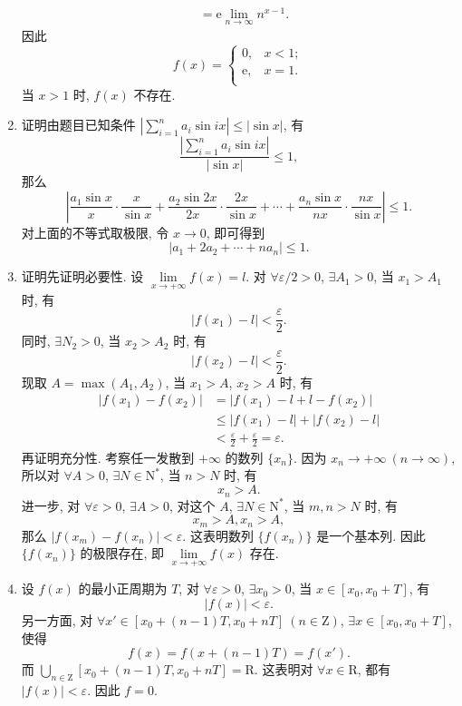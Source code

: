 \begin{enumerate}
\begin{align*}
                 &= \mathrm{e} \lim_{n\to\infty} n^{x-1}.
        \end{align*}
        因此
        \[
            f(x) =
                \begin{cases}
                    0, & x < 1; \\
                    \mathrm{e}, & x = 1. \\
                \end{cases}
        \]
        当 $x > 1$ 时, $f(x)$ 不存在.
    \item %
        {\heiti 证明}\quad 由题目已知条件 $\left|\sum\limits_{i=1}^n a_i\sin ix\right| \leqslant |\sin x|$, 有
        \[
            \frac{\left|\sum\limits_{i=1}^n a_i\sin ix\right|}{|\sin x|} \leqslant 1,   
        \]
        那么
        \[
            \left| \frac{a_1\sin x}{x}\cdot\frac{x}{\sin x} + \frac{a_2\sin2x}{2x}\cdot\frac{2x}{\sin x} + \cdots + \frac{a_n\sin x}{nx}\cdot\frac{nx}{\sin x} \right| \leqslant 1.
        \]
        对上面的不等式取极限, 令 $x \to 0$, 即可得到
        \[
            |a_1 + 2a_2 + \cdots + na_n| \leqslant 1.
        \]
    \item %
        {\heiti 证明}\quad 先证明必要性. 设 $\lim\limits_{x\to+\infty}f(x) = l$. 对 $\forall \varepsilon/2 > 0$, $\exists A_1 > 0$, 当 $x_1 > A_1$ 时, 有
        \[
            |f(x_1) - l| < \frac\varepsilon2.    
        \]
        同时, $\exists N_2 > 0$, 当 $x_2 > A_2$ 时, 有
        \[
            |f(x_2) - l| < \frac\varepsilon2.    
        \]
        现取 $A = \max(A_1, A_2)$, 当 $x_1 > A$, $x_2 > A$ 时, 有
        \begin{align*}
            |f(x_1) - f(x_2)| &= |f(x_1) - l + l - f(x_2)| \\
                              &\leqslant |f(x_1) - l| + |f(x_2) - l| \\
                              &< \frac\varepsilon2 + \frac\varepsilon2 = \varepsilon.
        \end{align*}
        再证明充分性. 考察任一发散到 $+\infty$ 的数列 $\{x_n\}$. 因为 $x_n\rightarrow+\infty\ (n\to\infty)$, 所以对 $\forall A > 0$, $\exists N \in \mathrm{N}^*$, 当 $n > N$ 时, 有
        \[
            x_n > A.    
        \]
        进一步, 对 $\forall \varepsilon > 0$, $\exists A > 0$, 对这个 $A$, $\exists N \in \mathrm{N}^*$, 当 $m, n > N$ 时, 有
        \[
            x_m > A, x_n > A,    
        \]
        那么 $|f(x_m) - f(x_n)| < \varepsilon$. 这表明数列 $\{f(x_n)\}$ 是一个基本列. 因此 $\{f(x_n)\}$ 的极限存在, 即 $\lim\limits_{x\to+\infty}f(x)$ 存在.
    \item %
        设 $f(x)$ 的最小正周期为 $T$, 对 $\forall \varepsilon > 0$, $\exists x_0 > 0$, 当 $x \in [x_0, x_0 + T]$, 有
        \[
            |f(x)| < \varepsilon.    
        \]
        另一方面, 对 $\forall x' \in [x_0 + (n-1)T, x_0 + nT]\ (n \in \mathrm{Z})$, $\exists x \in [x_0, x_0 + T]$, 使得
        \[
            f(x) = f(x + (n-1)T) = f(x').    
        \]
        而 $\bigcup\limits_{n\in\mathrm{Z}}[x_0 + (n-1)T, x_0 + nT] = \mathrm{R}$. 这表明对 $\forall x \in \mathrm{R}$, 都有 $|f(x)| < \varepsilon$. 因此 $f = 0$.
\end{enumerate}

% 